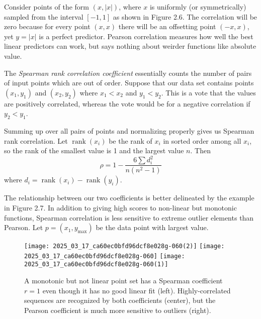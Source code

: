 \documentclass[10pt]{article}
\begin{document}
Consider points of the form \((x,|x|)\), where \(x\) is uniformly (or symmetrically) sampled from the interval \([-1,1]\) as shown in Figure 2.6. The correlation will be zero because for every point \((x, x)\) there will be an offsetting point \((-x, x)\), yet \(y=|x|\) is a perfect predictor. Pearson correlation measures how well the best linear predictors can work, but says nothing about weirder functions like absolute value.

The \textit{Spearman rank correlation coefficient} essentially counts the number of pairs of input points which are out of order. Suppose that our data set contains points \((x_{1}, y_{1})\) and \((x_{2}, y_{2})\) where \(x_{1}<x_{2}\) and \(y_{1}<y_{2}\). This is a vote that the values are positively correlated, whereas the vote would be for a negative correlation if \(y_{2}<y_{1}\).

Summing up over all pairs of points and normalizing properly gives us Spearman rank correlation. Let \(\operatorname{rank}\left(x_{i}\right)\) be the rank of \(x_{i}\) in sorted order among all \(x_{i}\), so the rank of the smallest value is 1 and the largest value \(n\). Then
\[
\rho=1-\frac{6 \sum d_{i}^{2}}{n\left(n^{2}-1\right)}
\]
where \(d_{i}=\operatorname{rank}\left(x_{i}\right)-\operatorname{rank}\left(y_{i}\right)\).

The relationship between our two coefficients is better delineated by the example in Figure 2.7. In addition to giving high scores to non-linear but monotonic functions, Spearman correlation is less sensitive to extreme outlier elements than Pearson. Let \(p=(x_{1}, y_{\max})\) be the data point with largest value.

\begin{figure}[h]
    \centering
    \texttt{[image: 2025\_03\_17\_ca60ec0bfd96dcf8e028g-060(2)]}
    \texttt{[image: 2025\_03\_17\_ca60ec0bfd96dcf8e028g-060]}
    \texttt{[image: 2025\_03\_17\_ca60ec0bfd96dcf8e028g-060(1)]}
    \caption{A monotonic but not linear point set has a Spearman coefficient \(r=1\) even though it has no good linear fit (left). Highly-correlated sequences are recognized by both coefficients (center), but the Pearson coefficient is much more sensitive to outliers (right).}
\end{figure}
\end{document}
